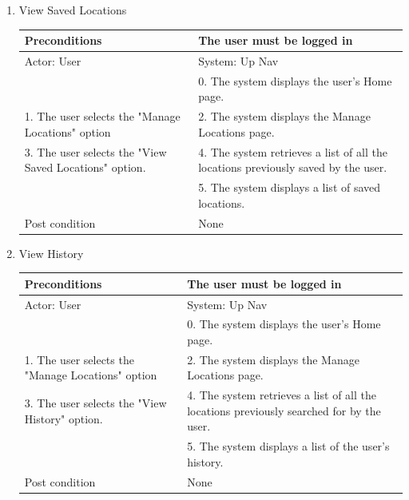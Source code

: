 \documentclass{article}
\begin{document}
\begin{enumerate}
\begin{center}
\begin{enumerate}
\begin{enumerate}
	\item{View Saved Locations}

	\begin{table}[H]
	\centering
		\begin{tabular}{ | p{15em} | p{15em}| }
		\hline
		Preconditions                                          										& The user must be logged in \\ 
		\hline
		Actor: User                                            										& System: Up Nav \\
		\hline
                                                       												& 0. The system displays the user's Home page. \\ 
		\hline
		1. The user selects the "Manage Locations" option								& 2. The system displays the Manage Locations page. \\
		\hline
		3. The user selects the "View Saved Locations" option.							& 4. The system retrieves a list of all the locations previously saved by the user. \\ 
		\hline
                                                      												& 5. The system displays a list of saved locations. \\
		\hline
		Post condition                                         		 								& None                                                                              \\
		\hline
		\end{tabular}
	\end{table}

	\item{View History}

	\begin{table}[H]
	\centering
		\begin{tabular}{ | p{15em} | p{15em}| }
		\hline
		Preconditions                                   										& The user must be logged in \\ 
		\hline
		Actor: User                                    										& System: Up Nav \\ 
		\hline
                                               													& 0. The system displays the user's Home page. \\ 
		\hline
		1. The user selects the "Manage Locations" option								& 2. The system displays the Manage Locations page. \\
		\hline
		3. The user selects the "View History" option. 									& 4. The system retrieves a list of all the locations previously searched for by the user. \\ 
		\hline
                                               													& 5. The system displays a list of the user's history. \\
		 \hline
		Post condition                                 										& None \\ 
		\hline
		\end{tabular}
	\end{table}


\end{enumerate}
\end{enumerate}
\end{center}
\end{enumerate}
\end{document}
